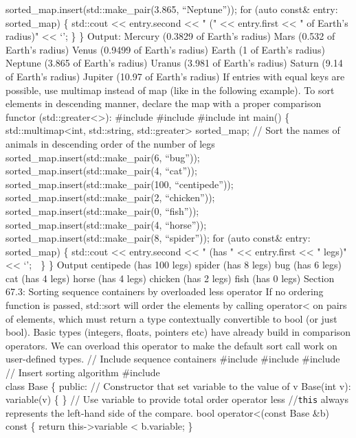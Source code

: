 sorted\_map.insert(std::make\_pair(3.865, ``Neptune'')); for (auto
const\& entry: sorted\_map) \{ std::cout \textless\textless{}
entry.second \textless\textless{} " (" \textless\textless{} entry.first
\textless\textless{} " of Earth's radius)" \textless\textless{} `\n'; \}
\} Output: Mercury (0.3829 of Earth's radius) Mars (0.532 of Earth's
radius) Venus (0.9499 of Earth's radius) Earth (1 of Earth's radius)
Neptune (3.865 of Earth's radius) Uranus (3.981 of Earth's radius)
Saturn (9.14 of Earth's radius) Jupiter (10.97 of Earth's radius) If
entries with equal keys are possible, use multimap instead of map (like
in the following example). To sort elements in descending manner,
declare the map with a proper comparison functor
(std::greater\textless\textgreater): \#include \#include \#include int
main() \{ std::multimap\textless int, std::string,
std::greater\textgreater{} sorted\_map; // Sort the names of animals in
descending order of the number of legs
sorted\_map.insert(std::make\_pair(6, ``bug''));
sorted\_map.insert(std::make\_pair(4, ``cat''));
sorted\_map.insert(std::make\_pair(100, ``centipede''));
sorted\_map.insert(std::make\_pair(2, ``chicken''));
sorted\_map.insert(std::make\_pair(0, ``fish''));
sorted\_map.insert(std::make\_pair(4, ``horse''));
sorted\_map.insert(std::make\_pair(8, ``spider'')); for (auto const\&
entry: sorted\_map) \{ std::cout \textless\textless{} entry.second
\textless\textless{} " (has " \textless\textless{} entry.first
\textless\textless{} " legs)" \textless\textless{} `\n';  \} \} Output
centipede (has 100 legs) spider (has 8 legs) bug (has 6 legs) cat (has 4
legs) horse (has 4 legs) chicken (has 2 legs) fish (has 0 legs) Section
67.3: Sorting sequence containers by overloaded less operator If no
ordering function is passed, std::sort will order the elements by
calling operator\textless{} on pairs of elements, which must return a
type contextually convertible to bool (or just bool). Basic types
(integers, ﬂoats, pointers etc) have already build in comparison
operators. We can overload this operator to make the default sort call
work on user-deﬁned types. // Include sequence containers \#include
\#include \#include // Insert sorting algorithm \#include \\
class Base \{ public: // Constructor that set variable to the value of v
Base(int v): variable(v) \{ \} // Use variable to provide total order
operator less //\passthrough{\lstinline!this!} always represents the
left-hand side of the compare. bool operator\textless(const Base \&b)
const \{ return this-\textgreater variable \textless{} b.variable; \}
